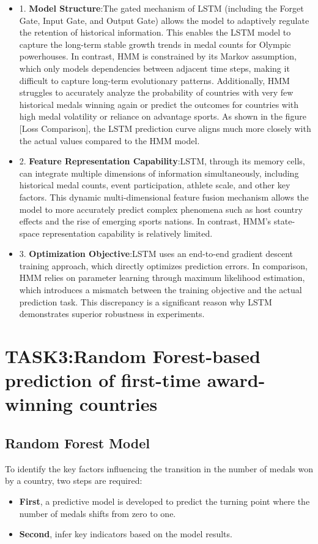 \documentclass{mcmthesis}
\begin{document}
\begin{itemize}
   \item  1.	{\bf Model Structure}:The gated mechanism of LSTM (including the Forget Gate, Input Gate, and Output Gate) allows the model to adaptively regulate the retention of historical information. This enables the LSTM model to capture the long-term stable growth trends in medal counts for Olympic powerhouses. In contrast, HMM is constrained by its Markov assumption, which only models dependencies between adjacent time steps, making it difficult to capture long-term evolutionary patterns. Additionally, HMM struggles to accurately analyze the probability of countries with very few historical medals winning again or predict the outcomes for countries with high medal volatility or reliance on advantage sports. As shown in the figure [Loss Comparison], the LSTM prediction curve aligns much more closely with the actual values compared to the HMM model.
\item 2.	{\bf Feature Representation Capability}:LSTM, through its memory cells, can integrate multiple dimensions of information simultaneously, including historical medal counts, event participation, athlete scale, and other key factors. This dynamic multi-dimensional feature fusion mechanism allows the model to more accurately predict complex phenomena such as host country effects and the rise of emerging sports nations. In contrast, HMM’s state-space representation capability is relatively limited.
\item 3.	{\bf Optimization Objective}:LSTM uses an end-to-end gradient descent training approach, which directly optimizes prediction errors. In comparison, HMM relies on parameter learning through maximum likelihood estimation, which introduces a mismatch between the training objective and the actual prediction task. This discrepancy is a significant reason why LSTM demonstrates superior robustness in experiments.

\end{itemize}

\section{TASK3:Random Forest-based prediction of first-time award-winning countries}

\subsection{Random Forest Model}
To identify the key factors influencing the transition in the number of medals won by a country, two steps are required:
\begin{itemize}
\item {\bf First}, a predictive model is developed to predict the turning point where the number of medals shifts from zero to one.        
\item {\bf Second}, infer key indicators based on the model results.
\end{itemize}
\end{document}
